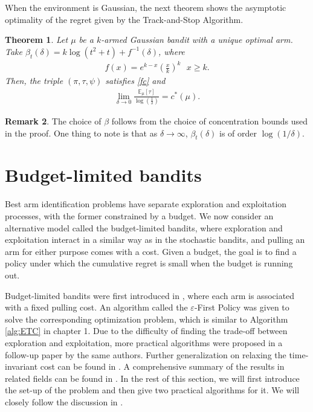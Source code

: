 \documentclass[10pt, openright]{book}
\numberwithin{equation}{section}
\theoremstyle{plain}
\newtheorem{Th}{Theorem}[section]
\theoremstyle{definition}
\newtheorem{Rem}[Th]{Remark}
\def\E{{\mathbb E}}
\def\e{{\varepsilon}}
\begin{document}
When the environment is Gaussian, the next theorem shows the asymptotic optimality of the regret given by the Track-and-Stop Algorithm. 

\begin{Th}
Let $\mu$ be a $k$-armed Gaussian bandit with a unique optimal arm. Take $\beta_t(\delta)=k\log (t^2+t)+f^{-1}(\delta)$, where
\begin{align*}
f(x)=e^{k-x}\left(\frac{x}{k}\right)^k\ \ \ x\geq k. 
\end{align*}
Then, the triple $(\pi, \tau, \psi)$ satisfies \eqref{fc} and 
\begin{align*}
\displaystyle\lim_{\delta\to 0}\frac{\E_\mu[\tau]}{\log\left(\frac{1}{\delta}\right)}=c^*(\mu). 
\end{align*}
\end{Th}
\begin{Rem}
The choice of $\beta$ follows from the choice of concentration bounds used in the proof. One thing to note is that as $\delta\to\infty$, $\beta_t(\delta)$ is of order $\log(1/\delta)$. 
\end{Rem}

\section{Budget-limited bandits}

Best arm identification problems have separate exploration and exploitation processes, with the former constrained by a budget.  We now consider an alternative model called the budget-limited bandits, where exploration and exploitation interact in a similar way as in the stochastic bandits, and pulling an arm for either purpose comes with a cost. Given a budget, the goal is to find a policy under which the cumulative regret is small when the budget is running out. 

Budget-limited bandits were first introduced in \cite{tran2010epsilon}, where each arm is associated with a fixed pulling cost. An algorithm called the $\e$-First Policy was given to solve the corresponding optimization problem, which is similar to Algorithm \ref{alg:ETC} in chapter 1. 
Due to the difficulty of finding the trade-off between exploration and exploitation, more practical algorithms were proposed in a follow-up paper \cite{tran2012knapsack} by the same authors. Further generalization on relaxing the time-invariant cost can be found in \cite{ding2013multi}. A comprehensive summary of the results in related fields can be found in \cite{zhou2018budget}. In the rest of this section, we will first introduce the set-up of the problem and then give two practical algorithms for it. We will closely follow the discussion in \cite{tran2012knapsack}. 
\end{document}
